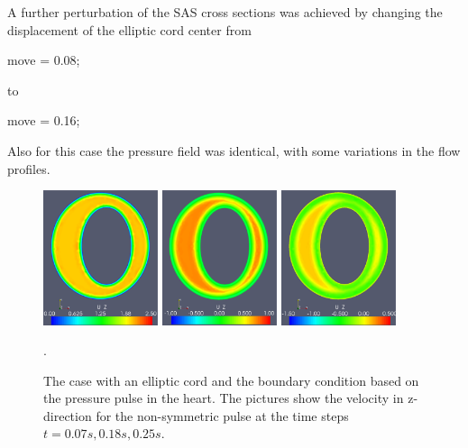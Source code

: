 A further perturbation of the SAS cross sections was achieved by
changing the displacement of the elliptic cord center from
\begin{bash}
move = 0.08;
\end{bash}
to
\begin{bash}
move = 0.16;
\end{bash}
Also for this case the pressure field was identical, with some
variations in the flow profiles.

\begin{figure}\begin{center}
\includegraphics[width=0.3\textwidth]{chapters/hentschel/pdf/pulse_f1_08_elliptic_sysmax_nmb7.pdf}
\includegraphics[width=0.3\textwidth]{chapters/hentschel/pdf/pulse_f1_08_elliptic_sysdia_nmb18.pdf}
\includegraphics[width=0.3\textwidth]{chapters/hentschel/pdf/pulse_f1_08_elliptic_diamin1_nmb25.pdf}
\caption{The case with an elliptic cord and the boundary condition based on
the pressure pulse in the heart. The pictures show the velocity in z-direction for the non-symmetric pulse at
the time steps $t=0.07s, 0.18s, 0.25s$.}
\label{fig:case3}.
\end{center}\end{figure}

